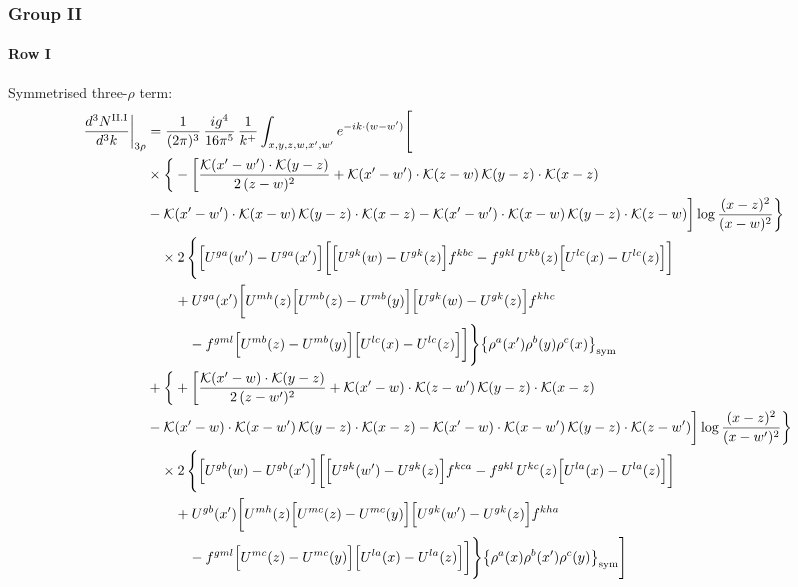 \documentclass[9pt]{article}
\numberwithin{equation}{section}
\begin{document}
\subsubsection{Group II}
\paragraph*{Row I}
Symmetrised three-$\rho$ term:
\begin{align}
\frac{d^{3}N^{\rm II.I}}{d^{3}k}\bigg|_{3\rho}&=\frac{1}{(2\pi)^{3}}\,\frac{ig^{4}}{16\pi^{5}}\,\frac{1}{k^{+}}\int_{x,y,z,w,x',w'}e^{-ik\cdot(w-w')}\Bigg[\notag\\
&\times\bigg\{-\bigg[\frac{\mathcal{K}(x'-w')\cdot\mathcal{K}(y-z)}{2\,(z-w)^{2}}+\mathcal{K}(x'-w')\cdot\mathcal{K}(z-w)\,\mathcal{K}(y-z)\cdot\mathcal{K}(x-z)\notag\\
&-\mathcal{K}(x'-w')\cdot\mathcal{K}(x-w)\,\mathcal{K}(y-z)\cdot\mathcal{K}(x-z)-\mathcal{K}(x'-w')\cdot\mathcal{K}(x-w)\,\mathcal{K}(y-z)\cdot\mathcal{K}(z-w)\bigg]\log\frac{(x-z)^{2}}{(x-w)^{2}}\bigg\}\notag\\&\quad\times 2\,\Bigg\{\Big[U^{ga}(w')-U^{ga}(x')\Big]\bigg[\Big[U^{gk}(w)-U^{gk}(z)\Big]f^{kbc}-f^{gkl}\,U^{kb}(z)\Big[U^{lc}(x)-U^{lc}(z)\Big]\bigg]\notag\\&\qquad+U^{ga}(x')\bigg[U^{mh}(z)\Big[U^{mb}(z)-U^{mb}(y)\Big]\Big[U^{gk}(w)-U^{gk}(z)\Big]f^{khc}\notag\\&\qquad\quad-f^{gml}\Big[U^{mb}(z)-U^{mb}(y)\Big]\Big[U^{lc}(x)-U^{lc}(z)\Big]\bigg]\Bigg\}\big\{\rho^{a}(x')\rho^{b}(y)\rho^{c}(x)\big\}_{\rm sym}\notag\\
&+\bigg\{+\bigg[\frac{\mathcal{K}(x'-w)\cdot\mathcal{K}(y-z)}{2\,(z-w')^{2}}+\mathcal{K}(x'-w)\cdot\mathcal{K}(z-w')\,\mathcal{K}(y-z)\cdot\mathcal{K}(x-z)\notag\\
&-\mathcal{K}(x'-w)\cdot\mathcal{K}(x-w')\,\mathcal{K}(y-z)\cdot\mathcal{K}(x-z)-\mathcal{K}(x'-w)\cdot\mathcal{K}(x-w')\,\mathcal{K}(y-z)\cdot\mathcal{K}(z-w')\bigg]\log\frac{(x-z)^{2}}{(x-w')^{2}}\bigg\}\notag\\&\quad\times 2\,\Bigg\{\Big[U^{gb}(w)-U^{gb}(x')\Big]\bigg[\Big[U^{gk}(w')-U^{gk}(z)\Big]f^{kca}-f^{gkl}\,U^{kc}(z)\Big[U^{la}(x)-U^{la}(z)\Big]\bigg]\notag\\&\qquad+U^{gb}(x')\bigg[U^{mh}(z)\Big[U^{mc}(z)-U^{mc}(y)\Big]\Big[U^{gk}(w')-U^{gk}(z)\Big]f^{kha}\notag\\&\qquad\quad-f^{gml}\Big[U^{mc}(z)-U^{mc}(y)\Big]\Big[U^{la}(x)-U^{la}(z)\Big]\bigg]\Bigg\}\big\{\rho^{a}(x)\rho^{b}(x')\rho^{c}(y)\big\}_{\rm sym}\Bigg]\label{eq:H-II.I-3}
\end{align}
\end{document}
